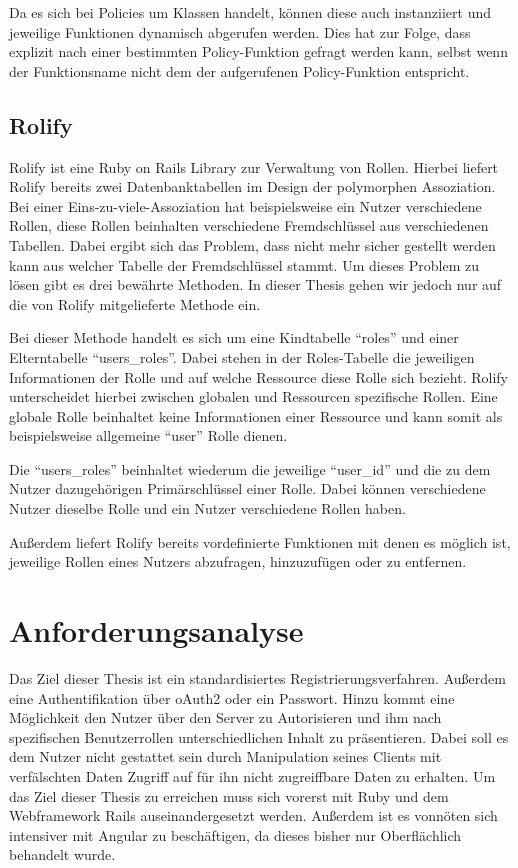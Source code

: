 \documentclass[paper=a4,fontsize=12pt,parskip=half]{scrartcl}
\begin{document}
	Da es sich bei Policies um Klassen handelt, können diese auch instanziiert und jeweilige Funktionen dynamisch abgerufen werden. Dies hat zur Folge, dass explizit nach einer bestimmten Policy-Funktion gefragt werden kann, selbst wenn der Funktionsname nicht dem der aufgerufenen Policy-Funktion entspricht.

	\subsection{Rolify}
	\label{sec: rolify}
	Rolify ist eine Ruby on Rails Library zur Verwaltung von Rollen. Hierbei liefert Rolify bereits zwei Datenbanktabellen im Design der polymorphen Assoziation. Bei einer Eins-zu-viele-Assoziation hat beispielsweise ein Nutzer verschiedene Rollen, diese Rollen beinhalten verschiedene Fremdschlüssel aus verschiedenen Tabellen. Dabei ergibt sich das Problem, dass nicht mehr sicher gestellt werden kann aus welcher Tabelle der Fremdschlüssel stammt. Um dieses Problem zu lösen gibt es drei bewährte Methoden. In dieser Thesis gehen wir jedoch nur auf die von Rolify mitgelieferte Methode ein.

	Bei dieser Methode handelt es sich um eine Kindtabelle \enquote{roles} und einer Elterntabelle \enquote{users\_roles}. Dabei stehen in der Roles-Tabelle die jeweiligen Informationen der Rolle und auf welche Ressource diese Rolle sich bezieht. Rolify unterscheidet hierbei zwischen globalen und Ressourcen spezifische Rollen. Eine globale Rolle beinhaltet keine Informationen einer Ressource und kann somit als beispielsweise allgemeine \enquote{user} Rolle dienen.

	Die \enquote{users\_roles} beinhaltet wiederum die jeweilige \enquote{user\_id} und die zu dem Nutzer dazugehörigen Primärschlüssel einer Rolle. Dabei können verschiedene Nutzer dieselbe Rolle und ein Nutzer verschiedene Rollen haben.

	Außerdem liefert Rolify bereits vordefinierte Funktionen mit denen es möglich ist, jeweilige Rollen eines Nutzers abzufragen, hinzuzufügen oder zu entfernen.

	\section{Anforderungsanalyse}
	\label{sec: analyze}
	Das Ziel dieser Thesis ist ein standardisiertes Registrierungsverfahren. Außerdem eine Authentifikation über \gls{oAuth2} oder ein Passwort. Hinzu kommt eine Möglichkeit den Nutzer über den Server zu Autorisieren und ihm nach spezifischen Benutzerrollen unterschiedlichen Inhalt zu präsentieren. Dabei soll es dem Nutzer nicht gestattet sein durch Manipulation seines Clients mit verfälschten Daten Zugriff auf für ihn nicht zugreiffbare Daten zu erhalten. Um das Ziel dieser Thesis zu erreichen muss sich vorerst mit Ruby und dem Webframework Rails auseinandergesetzt werden. Außerdem ist es vonnöten sich intensiver mit Angular zu beschäftigen, da dieses bisher nur Oberflächlich behandelt wurde.
\end{document}
